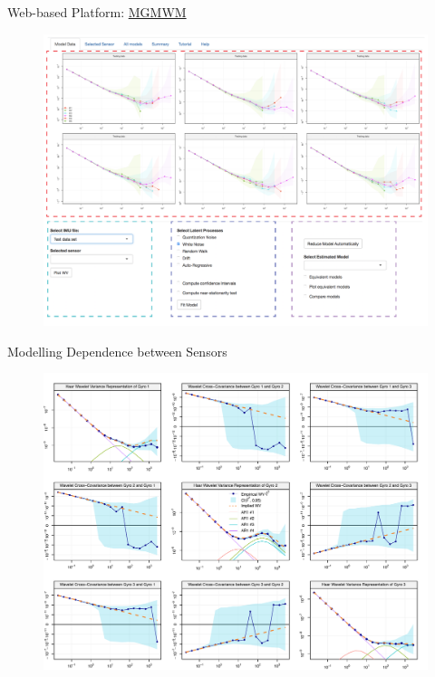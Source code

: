 \documentclass[envcountsect,usenames,dvipsnames]{beamer}
\theoremstyle{mystyle}
\begin{document}
\begin{frame}{Web-based Platform: \href{http://mgmwm.smac-group.com/}{MGMWM}}
    \begin{figure}
        \centering
        \includegraphics[scale = 0.26]{Images/app_mgmwm.pdf}
    \label{fig:appshiny2}
    \end{figure}
    
\end{frame}

\begin{frame}{Modelling Dependence between Sensors}
    \begin{figure}
        \centering
        \includegraphics[scale = 0.32]{Images/realdata_9plots.pdf}
    \end{figure}
\end{frame}
\end{document}
